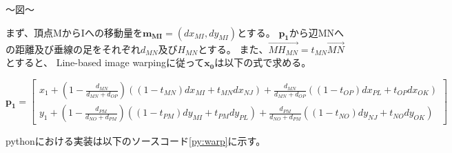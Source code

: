 ～図～

まず、頂点MからIへの移動量を$\bm{m_{MI}} = (dx_{MI}, dy_{MI})$とする。
$\bm{p_1}$から辺MNへの距離及び垂線の足をそれぞれ$d_{MN}$及び$H_{MN}$とする。
また、$\overrightarrow{MH_{MN}}=t_{MN}\overrightarrow{MN}$とすると、
Line-based image warping\cite{}に従って$\bm{x_0}$は以下の式で求める。

\begin{equation}\label{eq:warp}
    \bm{p_1} =  \begin{bmatrix} 
                    x_1 + \left( 1 - \frac{d_{MN}}{d_{MN}+d_{OP}} \right) \left( \left( 1 - t_{MN} \right) dx_{MI} + t_{MN} dx_{NJ} \right) + \frac{d_{MN}}{d_{MN}+d_{OP}} \left( \left( 1 - t_{OP} \right) dx_{PL} + t_{OP} dx_{OK} \right) \\
                    y_1 + \left( 1 - \frac{d_{PM}}{d_{NO}+d_{PM}} \right) \left( \left( 1 - t_{PM} \right) dy_{MI} + t_{PM} dy_{PL} \right) + \frac{d_{PM}}{d_{NO}+d_{PM}} \left( \left( 1 - t_{NO} \right) dy_{NJ} + t_{NO} dy_{OK} \right)
                \end{bmatrix}
\end{equation}

pythonにおける実装は以下のソースコード\ref{py:warp}に示す。

